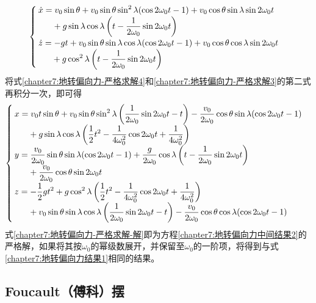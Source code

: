 \begin{equation}
\begin{cases}
	\ds \dot{x} = v_0\sin\theta+v_0\sin\theta\sin^2\lambda(\cos2\omega_0t-1) + v_0\cos\theta\sin\lambda\sin 2\omega_0t \\
	\ds \phantom{\dot{x} = }{} + g\sin\lambda\cos\lambda\left(t-\frac{1}{2\omega_0}\sin2\omega_0t\right) \\
	\ds \dot{z} = -gt + v_0\sin\theta\sin\lambda\cos\lambda(\cos2\omega_0t-1) + v_0\cos\theta\cos\lambda\sin2\omega_0t \\
	\ds \phantom{\dot{z} = }{} + g\cos^2\lambda\left(t-\frac{1}{2\omega_0}\sin2\omega_0t\right)
\end{cases}
\label{chapter7:地转偏向力-严格求解4}
\end{equation}
将式\eqref{chapter7:地转偏向力-严格求解4}和\eqref{chapter7:地转偏向力-严格求解3}的第二式再积分一次，即可得
\begin{equation}
\begin{cases}
	\ds x = v_0t\sin\theta+v_0\sin\theta\sin^2\lambda\left(\frac{1}{2\omega_0}\sin2\omega_0t-t\right) - \frac{v_0}{2\omega_0}\cos\theta\sin\lambda(\cos 2\omega_0t-1) \\
	\ds \phantom{\dot{x} = }{} + g\sin\lambda\cos\lambda\left(\frac12t^2-\frac{1}{4\omega_0^2}\cos2\omega_0t+\frac{1}{4\omega_0^2}\right) \\
	\ds y = \frac{v_0}{2\omega_0}\sin\theta\sin\lambda(\cos2\omega_0t-1) +\frac{g}{2\omega_0}\cos\lambda\left(t-\frac{1}{2\omega_0}\sin2\omega_0t\right) \\
	\ds \phantom{\dot{x} = }{} +\frac{v_0}{2\omega_0}\cos\theta\sin2\omega_0t \\
	\ds z = -\frac12gt^2 + g\cos^2\lambda\left(\frac12t^2-\frac{1}{4\omega_0^2}\cos2\omega_0t+\frac{1}{4\omega_0^2}\right) \\
	\ds \phantom{\dot{x} = }{}+v_0\sin\theta\sin\lambda\cos\lambda\left(\frac{1}{2\omega_0}\sin2\omega_0t-t\right) - \frac{v_0}{2\omega_0}\cos\theta\cos\lambda(\cos2\omega_0t-1)
\end{cases}
\label{chapter7:地转偏向力-严格求解-解}
\end{equation}
式\eqref{chapter7:地转偏向力-严格求解-解}即为方程\eqref{chapter7:地转偏向力中间结果2}的严格解，如果将其按$\omega_0$的幂级数展开，并保留至$\omega_0$的一阶项，将得到与式\eqref{chapter7:地转偏向力结果1}相同的结果。

\subsection{Foucault（傅科）摆}

